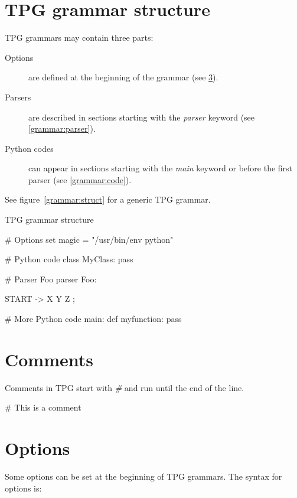 \section{TPG grammar structure}

TPG grammars may contain three parts:

\begin{description}
	\item [Options]
		are defined at the beginning of the grammar (see \ref{grammar:options}).
	\item [Parsers]
		are described in sections starting with the \emph{parser} keyword (see \ref{grammar:parser}).
	\item [Python codes]
		can appear in sections starting with the \emph{main} keyword or before the first parser (see \ref{grammar:code}).
\end{description}

See figure~\ref{grammar:struct} for a generic TPG grammar.

\begin{code}
\caption{TPG grammar structure}								\label{grammar:struct}
\begin{verbatimtab}[4]
# Options
set magic = "/usr/bin/env python"

# Python code
{{
	class MyClass:
		pass
}}

# Parser Foo
parser Foo:

	START -> X Y Z ;

# More Python code
main:
{{
	def myfunction:
		pass
}}
\end{verbatimtab}
\end{code}

\section{Comments}

Comments in TPG start with \emph{\#} and run until the end of the line.

\begin{verbatimtab}[4]
	# This is a comment
\end{verbatimtab}

\section{Options}											\label{grammar:options}

Some options can be set at the beginning of TPG grammars.
The syntax for options is:

